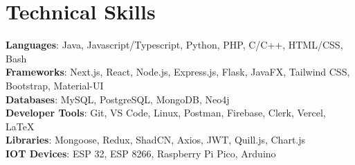 \documentclass[letterpaper,11pt]{article}
\begin{document}
\section{Technical Skills}
 \begin{itemize}[leftmargin=0.15in, label={}]
    \small{\item{
     \textbf{Languages}{: Java, Javascript/Typescript, Python, PHP, C/C++, HTML/CSS, Bash} \\
     \textbf{Frameworks}{: Next.js, React, Node.js, Express.js, Flask, JavaFX, Tailwind CSS, Bootstrap, Material-UI} \\
     \textbf{Databases}{: MySQL, PostgreSQL, MongoDB, Neo4j} \\
     \textbf{Developer Tools}{: Git, VS Code, Linux, Postman, Firebase, Clerk, Vercel, LaTeX} \\
     \textbf{Libraries}{: Mongoose, Redux, ShadCN, Axios, JWT, Quill.js, Chart.js} \\
     \textbf{IOT Devices}{: ESP 32, ESP 8266, Raspberry Pi Pico, Arduino}
    }}
 \end{itemize}


\end{document}
